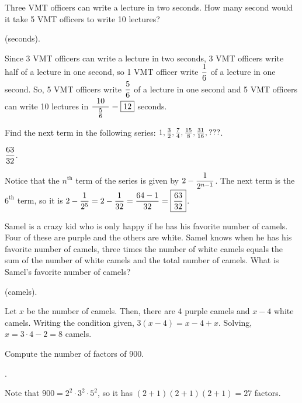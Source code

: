 \documentclass[11pt]{article}
\DeclareRobustCommand{\frac}[3][0pt]{%
  {\begingroup\hspace{#1}#2\hspace{#1}\endgroup\over\hspace{#1}#3\hspace{#1}}}
\begin{document}
\begin{problem}Three VMT officers can write a lecture in two seconds. How many second would it take 5 VMT officers to write 10 lectures?
\end{problem}

 (seconds).
\begin{solution}
Since 3 VMT officers can write a lecture in two seconds, 3 VMT officers write half of a lecture in one second, so 1 VMT officer write $\displaystyle \frac{1}{6}$ of a lecture in one second. So, 5 VMT officers write $\displaystyle \frac{5}{6}$ of a lecture in one second and 5 VMT officers can write 10 lectures in $\displaystyle \frac[5pt]{10}{\frac{5}{6}} = \boxed{12}$ seconds.
\end{solution}

\begin{problem}Find the next term in the following series: $1, \frac{3}{2}, \frac{7}{4}, \frac{15}{8}, \frac{31}{16}, ???$.
\end{problem}

\answer $\displaystyle \frac{63}{32}$.
\begin{solution}
Notice that the $n^{\text{th}}$ term of the series is given by $\displaystyle 2 - \frac{1}{2^{n-1}}$. The next term is the $6^{\text{th}}$ term, so it is $\displaystyle 2 - \frac{1}{2^{5}} = 2 - \frac{1}{32} = \frac{64 - 1}{32} = \boxed{\frac{63}{32}}$.
\end{solution}

\begin{problem} Samel is a crazy kid who is only happy if he has his favorite number of camels. Four of these are purple and the others are white. Samel knows when he has his favorite number of camels, three times the number of white camels equals the sum of the number of white camels and the total number of camels. What is Samel's favorite number of camels?
\end{problem}

 (camels).
\begin{solution}
Let $x$ be the number of camels. Then, there are 4 purple camels and $x - 4$ white camels. Writing the condition given, $3(x - 4) = x - 4 + x$. Solving, $x = 3 \cdot 4 - 2 = \boxed{8}$ camels.
\end{solution}

\begin{problem} Compute the number of factors of 900.
\end{problem}

.
\begin{solution}
Note that $900 = 2^2 \cdot 3^2 \cdot 5^2$, so it has $(2 + 1)(2 + 1)(2 + 1) = \boxed{27}$ factors.
\end{solution}
\end{document}
